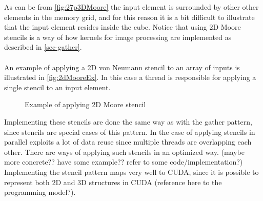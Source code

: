 As can be from \autoref{fig:27p3DMoore} the input element is surrounded by other other elements in the memory grid, and for this reason it is a bit difficult to illustrate that the input element resides inside the cube.
Notice that using 2D Moore stencils is a way of how kernels for image processing are implemented as described in \autoref{sec-gather}.
\\\\
An example of applying a 2D von Neumann stencil to an array of inputs is illustrated in \autoref{fig:2dMooreEx}.
In this case a thread is responsible for applying a single stencil to an input element.
\begin{figure}[ht]
	\centering
	\caption{Example of applying 2D Moore stencil}
	\label{fig:2dMooreEx}
\end{figure}
Implementing these stencils are done the same way as with the gather pattern, since stencils are special cases of this pattern.
In the case of applying stencils in parallel exploits a lot of data reuse since multiple threads are overlapping each other.
There are ways of applying such stencils in an optimized way. (maybe more concrete?? have some example?? refer to some code/implementation?)
Implementing the stencil pattern maps very well to CUDA, since it is possible to represent both 2D and 3D structures in CUDA (reference here to the programming model?). 